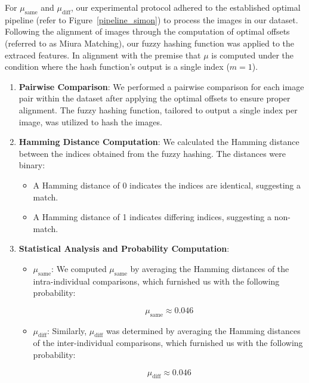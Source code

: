 For \(\mu_{\text{same}}\) and \(\mu_{\text{diff}}\), our experimental protocol adhered to the established optimal pipeline (refer to Figure~\ref{pipeline_simon}) to process the images in our dataset. Following the alignment of images through the computation of optimal offsets (referred to as Miura Matching), our fuzzy hashing function was applied to the extraced features. In alignment with the premise that \(\mu\) is computed under the condition where the hash function's output is a single index (\(m=1\)).

\begin{enumerate}
    \item \textbf{Pairwise Comparison}: We performed a pairwise comparison for each image pair within the dataset after applying the optimal offsets to ensure proper alignment. The fuzzy hashing function, tailored to output a single index per image, was utilized to hash the images.

    \item \textbf{Hamming Distance Computation}: We calculated the Hamming distance between the indices obtained from the fuzzy hashing. The distances were binary:
    \begin{itemize}
        \item A Hamming distance of 0 indicates the indices are identical, suggesting a match.
        \item A Hamming distance of 1 indicates differing indices, suggesting a non-match.
    \end{itemize}
    
    \item \textbf{Statistical Analysis and Probability Computation}:
    \begin{itemize}
        \item \textbf{\(\mu_{\text{same}}\)}: We computed \(\mu_{\text{same}}\) by averaging the Hamming distances of the intra-individual comparisons, which furnished us with the following probability:

        \[ \mu_{\text{same}} \approx 0.046 \]
        
        \item \textbf{\(\mu_{\text{diff}}\)}: Similarly, \(\mu_{\text{diff}}\) was determined by averaging the Hamming distances of the inter-individual comparisons, which furnished us with the following probability:

        \[ \mu_{\text{diff}} \approx 0.046 \]
    \end{itemize}
    

\end{enumerate}
